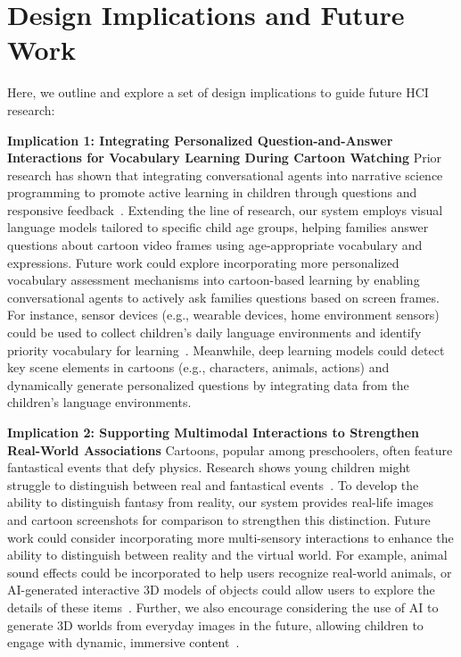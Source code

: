 \section{Design Implications and Future Work}
Here, we outline and explore a set of design implications to guide future HCI research:

\textbf{Implication 1: Integrating Personalized Question-and-Answer Interactions for Vocabulary Learning During Cartoon Watching}
Prior research has shown that integrating conversational agents into narrative science programming to promote active learning in children through questions and responsive feedback~\cite{10.1145/3491102.3502050}.
Extending the line of research, our system employs visual language models tailored to specific child age groups, helping families answer questions about cartoon video frames using age-appropriate vocabulary and expressions.
Future work could explore incorporating more personalized vocabulary assessment mechanisms into cartoon-based learning by enabling conversational agents to actively ask families questions based on screen frames. For instance, sensor devices (e.g., wearable devices, home environment sensors) could be used to collect children's daily language environments and identify priority vocabulary for learning~\cite{lee2024open}. Meanwhile, deep learning models could detect key scene elements in cartoons (e.g., characters, animals, actions) and dynamically generate personalized questions by integrating data from the children's language environments.

\textbf{Implication 2: Supporting Multimodal Interactions to Strengthen Real-World Associations}
Cartoons, popular among preschoolers, often feature fantastical events that defy physics. Research shows young children might struggle to distinguish between real and fantastical events~\cite{li2015can}.
To develop the ability to distinguish fantasy from reality, our system provides real-life images and cartoon screenshots for comparison to strengthen this distinction.
Future work could consider incorporating more multi-sensory interactions to enhance the ability to distinguish between reality and the virtual world. For example, animal sound effects could be incorporated to help users recognize real-world animals, or AI-generated interactive 3D models of objects could allow users to explore the details of these items~\cite{ma2024research}. Further, we also encourage considering the use of AI to generate 3D worlds from everyday images in the future, allowing children to engage with dynamic, immersive content~\cite{worldlabs}.

